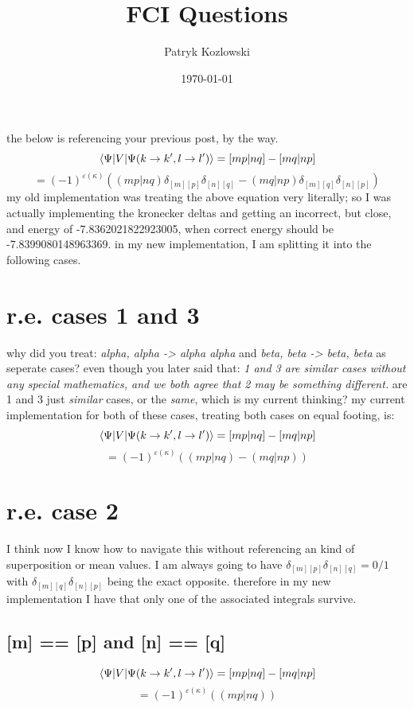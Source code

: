 \documentclass[12pt]{article}
\title{FCI Questions}
\author{Patryk Kozlowski}
\date{\today}
\begin{document}
\maketitle
the below is referencing your previous post, by the way.
\begin{equation}
    \mel{\Psi }{V}{\Psi (k\rightarrow k^{\prime}, l\rightarrow l^{\prime})}
    =[mp|nq]-[mq|np]
\end{equation}
\begin{equation}
    =(-1)^{\varepsilon (\kappa )}((mp|nq)\delta _{[m][p]}\delta _{[n][q]}-(mq|np)\delta _{[m][q]}\delta _{[n][p]})
\end{equation}
my old implementation was treating the above equation very literally; so I was actually implementing the kronecker deltas and getting an incorrect, but close, and energy of -7.8362021822923005, when correct energy should be -7.8399080148963369. in my new implementation, I am splitting it into the following cases.
\section{r.e. cases 1 and 3}
why did you treat: \emph{alpha, alpha -> alpha alpha} and \emph{beta, beta -> beta, beta} as seperate cases? even though you later said that: \emph{1 and 3 are similar cases without any special mathematics, and we both agree that 2 may be something different.} are 1 and 3 just \emph{similar} cases, or the \emph{same}, which is my current thinking? my current implementation for both of these cases, treating both cases on equal footing, is:
\begin{equation}
    \mel{\Psi }{V}{\Psi (k\rightarrow k^{\prime}, l\rightarrow l^{\prime})}
    =[mp|nq]-[mq|np]
\end{equation}
\begin{equation}
    =(-1)^{\varepsilon (\kappa )}((mp|nq)-(mq|np))
\end{equation}
\section{r.e. case 2}
I think now I know how to navigate this without referencing an kind of superposition or mean values. I am always going to have $\delta _{[m][p]}\delta _{[n][q]}=0/1$ with $\delta _{[m][q]}\delta _{[n][p]}$ being the exact opposite. therefore in my new implementation I have that only one of the associated integrals survive. 
\subsection{[m] == [p] and [n] == [q]}
\begin{equation}
    \mel{\Psi }{V}{\Psi (k\rightarrow k^{\prime}, l\rightarrow l^{\prime})}
    =[mp|nq]-[mq|np]
\end{equation}
\begin{equation}
    =(-1)^{\varepsilon (\kappa )}((mp|nq))
\end{equation}
\end{document}
